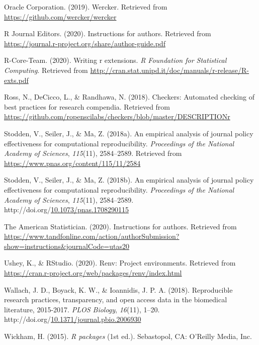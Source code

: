 \documentclass[12pt,twoside]{reedthesis}
\newenvironment{CSLReferences}%
  {}%
  {\par}
\begin{document}
\begin{CSLReferences}{1}{0}
\leavevmode\hypertarget{ref-wercker}{}%
Oracle Corporation. (2019). Wercker. Retrieved from \url{https://github.com/wercker/wercker}

\leavevmode\hypertarget{ref-r-journal}{}%
R Journal Editors. (2020). Instructions for authors. Retrieved from \url{https://journal.r-project.org/share/author-guide.pdf}

\leavevmode\hypertarget{ref-coreteam-extensions}{}%
R-Core-Team. (2020). Writing r extensions. \emph{R Foundation for Statistical Computing}. Retrieved from \url{http://cran.stat.unipd.it/doc/manuals/r-release/R-exts.pdf}

\leavevmode\hypertarget{ref-R-checkers}{}%
Ross, N., DeCicco, L., \& Randhawa, N. (2018). Checkers: Automated checking of best practices for research compendia. Retrieved from \url{https://github.com/ropenscilabs/checkers/blob/master/DESCRIPTIONr}

\leavevmode\hypertarget{ref-policy-effectiveness}{}%
Stodden, V., Seiler, J., \& Ma, Z. (2018a). An empirical analysis of journal policy effectiveness for computational reproducibility. \emph{Proceedings of the National Academy of Sciences}, \emph{115}(11), 2584--2589. Retrieved from \url{https://www.pnas.org/content/115/11/2584}

\leavevmode\hypertarget{ref-Stodden2584}{}%
Stodden, V., Seiler, J., \& Ma, Z. (2018b). An empirical analysis of journal policy effectiveness for computational reproducibility. \emph{Proceedings of the National Academy of Sciences}, \emph{115}(11), 2584--2589. http://doi.org/\href{https://doi.org/10.1073/pnas.1708290115}{10.1073/pnas.1708290115}

\leavevmode\hypertarget{ref-ams-guide}{}%
The American Statistician. (2020). Instructions for authors. Retrieved from \url{https://www.tandfonline.com/action/authorSubmission?show=instructions\&journalCode=utas20}

\leavevmode\hypertarget{ref-R-renv}{}%
Ushey, K., \& RStudio. (2020). Renv: Project environments. Retrieved from \url{https://cran.r-project.org/web/packages/renv/index.html}

\leavevmode\hypertarget{ref-plos-biology}{}%
Wallach, J. D., Boyack, K. W., \& Ioannidis, J. P. A. (2018). Reproducible research practices, transparency, and open access data in the biomedical literature, 2015-2017. \emph{PLOS Biology}, \emph{16}(11), 1--20. http://doi.org/\href{https://doi.org/10.1371/journal.pbio.2006930}{10.1371/journal.pbio.2006930}

\leavevmode\hypertarget{ref-hadley-packages}{}%
Wickham, H. (2015). \emph{R packages} (1st ed.). Sebastopol, CA: O'Reilly Media, Inc.


\end{CSLReferences}
\end{document}
